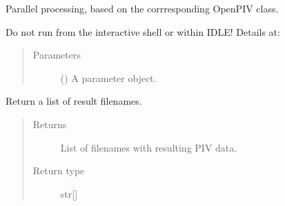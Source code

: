 \documentclass[letterpaper,10pt,english]{sphinxmanual}
\begin{document}
\begin{fulllineitems}
\label{\detokenize{multiprocessing:openpivgui.MultiProcessing.MultiProcessing}}
Parallel processing, based on the corrresponding OpenPIV class.

Do not run from the interactive shell or within IDLE! Details at:
\begin{quote}\begin{description}
\item[{Parameters}] \leavevmode
{} ({\hyperref[\detokenize{openpivparams:openpivgui.OpenPivParams.OpenPivParams}]{}}) \textendash{} A parameter object.

\end{description}\end{quote}

\begin{fulllineitems}
\label{\detokenize{multiprocessing:openpivgui.MultiProcessing.MultiProcessing.get_save_fnames}}
Return a list of result filenames.
\begin{quote}\begin{description}
\item[{Returns}] \leavevmode
List of filenames with resulting PIV data.

\item[{Return type}] \leavevmode
str{[}{]}

\end{description}\end{quote}

\end{fulllineitems}



\end{fulllineitems}
\end{document}
